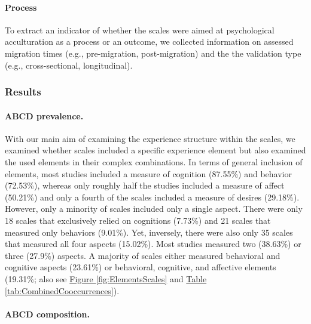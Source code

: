 \documentclass[man, 12pt, a4paper, mask]{apa7}
\newcommand{\fgrref}[2][]{\hyperref[#2]{Figure \ref*{#2}#1}}
\newcommand{\tblref}[2][]{\hyperref[#2]{Table \ref*{#2}#1}}
\begin{document}
\paragraph{Process}

To extract an indicator of whether the scales were aimed at
psychological acculturation as a process or an outcome, we collected
information on assessed migration times (e.g., pre-migration,
post-migration) and the the validation type (e.g., cross-sectional,
longitudinal).

\subsubsection{Results}

\paragraph{ABCD prevalence.}

With our main aim of examining the experience structure within the
scales, we examined whether scales included a specific experience
element but also examined the used elements in their complex
combinations. In terms of general inclusion of elements, most studies
included a measure of cognition (87.55\%) and behavior (72.53\%),
whereas only roughly half the studies included a measure of affect
(50.21\%) and only a fourth of the scales included a measure of desires
(29.18\%). However, only a minority of scales included only a single
aspect. There were only 18 scales that exclusively relied on cognitions
(7.73\%) and 21 scales that measured only behaviors (9.01\%). Yet,
inversely, there were also only 35 scales that measured all four aspects
(15.02\%). Most studies measured two (38.63\%) or three (27.9\%)
aspects. A majority of scales either measured behavioral and cognitive
aspects (23.61\%) or behavioral, cognitive, and affective elements
(19.31\%; also see \fgrref{fig:ElementsScales} and
\tblref{tab:CombinedCooccurrences}).

\paragraph{ABCD composition.}
\end{document}
